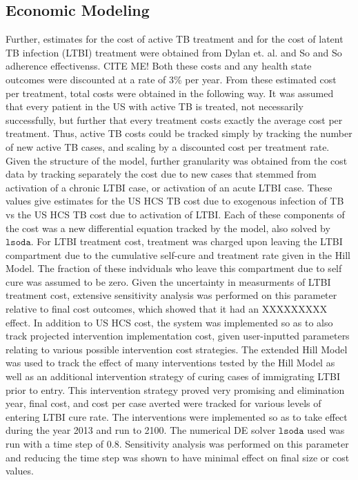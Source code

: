 \documentclass{amsart}
\begin{document}
\subsection{Economic Modeling}
Further, estimates for the cost of active TB treatment and for the cost of
latent TB infection (LTBI) treatment were obtained from Dylan et. al. and So and
So adherence effectivenss. CITE ME!
Both these costs and any health state outcomes were discounted at a rate of 3\%
per year. From these estimated cost per treatment, total costs were obtained in
the following way. It was assumed that every patient in the US with active TB is
treated, not necessarily successfully, but further that every treatment costs
exactly the average cost per treatment. Thus, active TB costs could be tracked
simply by tracking the number of new active TB cases, and scaling by a
discounted cost per treatment rate. Given the structure of the model, further
granularity was obtained from the cost data by tracking separately the cost due
to new cases that stemmed from activation of a chronic LTBI case, or activation
of an acute LTBI case. These values give estimates for the US HCS TB cost due to
exogenous infection of TB vs the US HCS TB cost due to activation of LTBI. Each
of these components of the cost was a new differential equation tracked by the
model, also solved by $\texttt{lsoda}$. For LTBI treatment cost, treatment was
charged upon leaving the LTBI compartment due to the cumulative self-cure and
treatment rate given in the Hill Model. The fraction of these indviduals who
leave this compartment due to self cure was assumed to be zero. Given the
uncertainty in measurments of LTBI treatment cost, extensive sensitivity
analysis was performed on this parameter relative to final cost outcomes, which
showed that it had an XXXXXXXXX effect. In addition to US HCS cost, the system
was implemented so as to also track projected intervention implementation cost,
given user-inputted parameters relating to various possible intervention cost
strategies. The extended Hill Model was used to track the effect of many
interventions tested by the Hill Model as well as an additional intervention
strategy of curing cases of immigrating LTBI prior to entry. This intervention
strategy proved very promising and elimination year, final cost, and cost per
case averted were tracked for various levels of entering LTBI cure rate. The
interventions were implemented so as to take effect during the year 2013 and run
to 2100. The numerical DE solver $\texttt{lsoda}$ used was run with a time step
of $0.8$. Sensitivity analysis was performed on this parameter and reducing the
time step was shown to have minimal effect on final size or cost values. 
\end{document}
